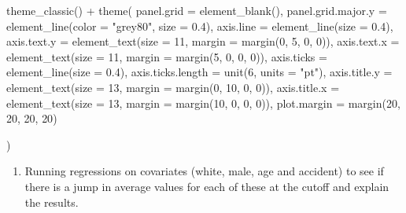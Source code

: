 \documentclass[
  11pt,
]{article}
\newenvironment{Shaded}{\begin{snugshade}}{\end{snugshade}}
\newcommand{\AttributeTok}[1]{\textcolor[rgb]{0.77,0.63,0.00}{#1}}
\newcommand{\DecValTok}[1]{\textcolor[rgb]{0.00,0.00,0.81}{#1}}
\newcommand{\FloatTok}[1]{\textcolor[rgb]{0.00,0.00,0.81}{#1}}
\newcommand{\FunctionTok}[1]{\textcolor[rgb]{0.00,0.00,0.00}{#1}}
\newcommand{\NormalTok}[1]{#1}
\newcommand{\SpecialCharTok}[1]{\textcolor[rgb]{0.00,0.00,0.00}{#1}}
\newcommand{\StringTok}[1]{\textcolor[rgb]{0.31,0.60,0.02}{#1}}
\providecommand{\tightlist}{%
  \setlength{\itemsep}{0pt}\setlength{\parskip}{0pt}}
\begin{document}
\begin{Shaded}
\begin{Highlighting}[]
  \FunctionTok{theme\_classic}\NormalTok{() }\SpecialCharTok{+}
  \FunctionTok{theme}\NormalTok{(}
    \AttributeTok{panel.grid =} \FunctionTok{element\_blank}\NormalTok{(),}
    \AttributeTok{panel.grid.major.y =} \FunctionTok{element\_line}\NormalTok{(}\AttributeTok{color =} \StringTok{"grey80"}\NormalTok{, }\AttributeTok{size =} \FloatTok{0.4}\NormalTok{),}
    \AttributeTok{axis.line =} \FunctionTok{element\_line}\NormalTok{(}\AttributeTok{size =} \FloatTok{0.4}\NormalTok{),}
    \AttributeTok{axis.text.y =} \FunctionTok{element\_text}\NormalTok{(}\AttributeTok{size =} \DecValTok{11}\NormalTok{, }\AttributeTok{margin =} \FunctionTok{margin}\NormalTok{(}\DecValTok{0}\NormalTok{, }\DecValTok{5}\NormalTok{, }\DecValTok{0}\NormalTok{, }\DecValTok{0}\NormalTok{)),}
    \AttributeTok{axis.text.x =} \FunctionTok{element\_text}\NormalTok{(}\AttributeTok{size =} \DecValTok{11}\NormalTok{, }\AttributeTok{margin =} \FunctionTok{margin}\NormalTok{(}\DecValTok{5}\NormalTok{, }\DecValTok{0}\NormalTok{, }\DecValTok{0}\NormalTok{, }\DecValTok{0}\NormalTok{)),}
    \AttributeTok{axis.ticks =} \FunctionTok{element\_line}\NormalTok{(}\AttributeTok{size =} \FloatTok{0.4}\NormalTok{),}
    \AttributeTok{axis.ticks.length =} \FunctionTok{unit}\NormalTok{(}\DecValTok{6}\NormalTok{, }\AttributeTok{units =} \StringTok{"pt"}\NormalTok{),}
    \AttributeTok{axis.title.y =} \FunctionTok{element\_text}\NormalTok{(}\AttributeTok{size =} \DecValTok{13}\NormalTok{, }\AttributeTok{margin =} \FunctionTok{margin}\NormalTok{(}\DecValTok{0}\NormalTok{, }\DecValTok{10}\NormalTok{, }\DecValTok{0}\NormalTok{, }\DecValTok{0}\NormalTok{)),}
    \AttributeTok{axis.title.x =} \FunctionTok{element\_text}\NormalTok{(}\AttributeTok{size =} \DecValTok{13}\NormalTok{, }\AttributeTok{margin =} \FunctionTok{margin}\NormalTok{(}\DecValTok{10}\NormalTok{, }\DecValTok{0}\NormalTok{, }\DecValTok{0}\NormalTok{, }\DecValTok{0}\NormalTok{)),}
    \AttributeTok{plot.margin =} \FunctionTok{margin}\NormalTok{(}\DecValTok{20}\NormalTok{, }\DecValTok{20}\NormalTok{, }\DecValTok{20}\NormalTok{, }\DecValTok{20}\NormalTok{)}

\NormalTok{  )}
\end{Highlighting}
\end{Shaded}

\begin{enumerate}
\def\labelenumi{\arabic{enumi}.}
\setcounter{enumi}{1}
\tightlist
\item
  Running regressions on covariates (white, male, age and accident) to
  see if there is a jump in average values for each of these at the
  cutoff and explain the results.
\end{enumerate}
\end{document}

